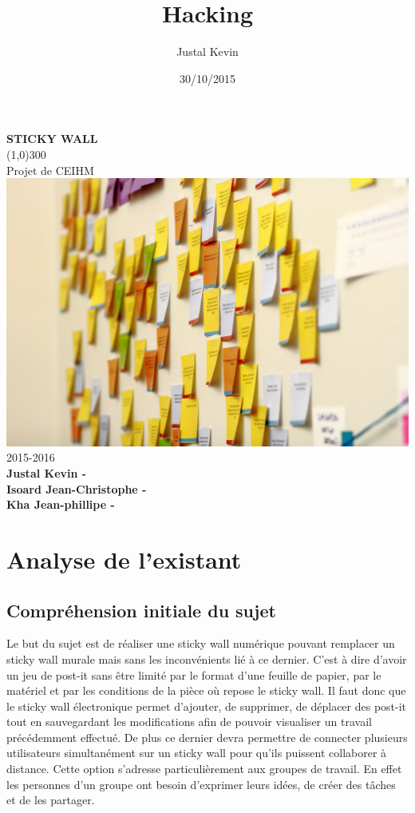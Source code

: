 \documentclass{article}
\title{Hacking}
\author{Justal Kevin}
\date{30/10/2015}
\begin{document}
\begin{center}
\textbf{\Huge{STICKY WALL}}\\
\line(1,0){300}\\
Projet de CEIHM\\
\vspace{3cm}
\includegraphics[width=\textwidth]{1}\\
\vspace{3cm}
2015-2016\\
\vspace{4.5cm}
\textbf{Justal Kevin - }\\
\textbf{Isoard Jean-Christophe - }\\
\textbf{Kha Jean-phillipe - }\\
\end{center}

\newpage
\tableofcontents

\newpage
\section{Analyse de l'existant}
\subsection{Compréhension initiale du sujet}
\hspace*{0.6cm}Le but du sujet est de réaliser une sticky wall numérique pouvant remplacer un sticky wall murale mais sans les inconvénients lié à ce dernier. C'est à dire d'avoir un jeu de post-it sans être limité par le format d'une feuille de papier, par le matériel et par les conditions de la pièce où repose le sticky wall. Il faut donc que le sticky wall électronique permet d'ajouter, de supprimer, de déplacer des post-it tout en sauvegardant les modifications afin de pouvoir visualiser un travail précédemment effectué. De plus ce dernier devra permettre de connecter plusieurs utilisateurs simultanément sur un sticky wall pour qu'ils puissent collaborer à distance. Cette option s'adresse particulièrement aux groupes de travail. En effet les personnes d’un groupe ont besoin d'exprimer leurs idées, de créer des tâches et de les partager.
\end{document}
